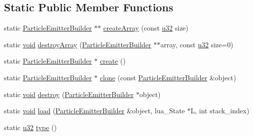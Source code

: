 \subsection*{Static Public Member Functions}
\begin{DoxyCompactItemize}
\item 
static \mbox{\hyperlink{classnjli_1_1_particle_emitter_builder}{Particle\+Emitter\+Builder}} $\ast$$\ast$ \mbox{\hyperlink{classnjli_1_1_particle_emitter_builder_a80b3c1b4e4f7ffb338f58ca24bdad33c}{create\+Array}} (const \mbox{\hyperlink{_util_8h_a10e94b422ef0c20dcdec20d31a1f5049}{u32}} size)
\item 
static \mbox{\hyperlink{_thread_8h_af1e856da2e658414cb2456cb6f7ebc66}{void}} \mbox{\hyperlink{classnjli_1_1_particle_emitter_builder_ac8289944f7f62b9e94e9952a1c985691}{destroy\+Array}} (\mbox{\hyperlink{classnjli_1_1_particle_emitter_builder}{Particle\+Emitter\+Builder}} $\ast$$\ast$array, const \mbox{\hyperlink{_util_8h_a10e94b422ef0c20dcdec20d31a1f5049}{u32}} size=0)
\item 
static \mbox{\hyperlink{classnjli_1_1_particle_emitter_builder}{Particle\+Emitter\+Builder}} $\ast$ \mbox{\hyperlink{classnjli_1_1_particle_emitter_builder_a9f350de3bd6d17484cbba9e1566ab04d}{create}} ()
\item 
static \mbox{\hyperlink{classnjli_1_1_particle_emitter_builder}{Particle\+Emitter\+Builder}} $\ast$ \mbox{\hyperlink{classnjli_1_1_particle_emitter_builder_aa233db2125a2dd99907dc35b56cda000}{clone}} (const \mbox{\hyperlink{classnjli_1_1_particle_emitter_builder}{Particle\+Emitter\+Builder}} \&object)
\item 
static \mbox{\hyperlink{_thread_8h_af1e856da2e658414cb2456cb6f7ebc66}{void}} \mbox{\hyperlink{classnjli_1_1_particle_emitter_builder_ad78bd0dfc56c6f70f76139887f4f2e4e}{destroy}} (\mbox{\hyperlink{classnjli_1_1_particle_emitter_builder}{Particle\+Emitter\+Builder}} $\ast$object)
\item 
static \mbox{\hyperlink{_thread_8h_af1e856da2e658414cb2456cb6f7ebc66}{void}} \mbox{\hyperlink{classnjli_1_1_particle_emitter_builder_a16d593b236422fd2f3ba87555d03db4e}{load}} (\mbox{\hyperlink{classnjli_1_1_particle_emitter_builder}{Particle\+Emitter\+Builder}} \&object, lua\+\_\+\+State $\ast$L, int stack\+\_\+index)
\item 
static \mbox{\hyperlink{_util_8h_a10e94b422ef0c20dcdec20d31a1f5049}{u32}} \mbox{\hyperlink{classnjli_1_1_particle_emitter_builder_a82aaac8c009b5310435c014aa26a0afc}{type}} ()
\end{DoxyCompactItemize}
